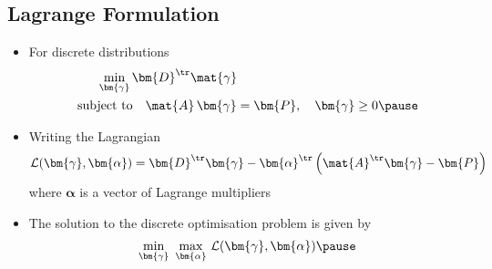 \begin{slide}
\section[-2]{Lagrange Formulation}

\begin{PauseHighLight}
  \begin{itemize}
  \item For discrete distributions
    \begin{align*}
      \min_{\bm{\gamma}} \bm{D}^\tr \mat{\gamma} \hspace{5cm} \\
      \text{subject to} \quad
      \mat{A}\,\bm{\gamma} = \bm{P}, \quad \bm{\gamma} \geq 0\pause
    \end{align*}
  \item Writing the Lagrangian 
    \begin{align*}
      \mathcal{L}(\bm{\gamma},\bm{\alpha})
      = \bm{D}^\tr \bm{\gamma} - \bm{\alpha}^\tr \left(
      \mat{A}^\tr \bm{\gamma} - \bm{P}\right)
    \end{align*}
    where $\bm{\alpha}$ is a vector of Lagrange multipliers\pause
  \item The solution to the discrete optimisation problem is given by
    \begin{align*}
      \min_{\bm{\gamma}} \, \, \max_{\bm{\alpha}} \,
      \mathcal{L}(\bm{\gamma},\bm{\alpha}) \pause
    \end{align*}
  \end{itemize}
\end{PauseHighLight}

\end{slide}


